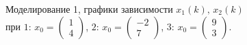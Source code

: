 \documentclass[a5paper, 10pt]{article}
\theoremstyle{definition}
\theoremstyle{plain}
\theoremstyle{remark}
\begin{document}
\begin{figure}[h!]
\caption{Моделирование 1, графики зависимости $x_1 \left( k \right), \, x_2 \left( k \right)$ \\ при  $1: \, x_0 = \begin{pmatrix} 1 \\ 4 \end{pmatrix}$, $2: \, x_0 = \begin{pmatrix} -2 \\ 7 \end{pmatrix}$, $3: \, x_0 = \begin{pmatrix} 9 \\ 3 \end{pmatrix}$.}
\end{figure}


\end{document}
